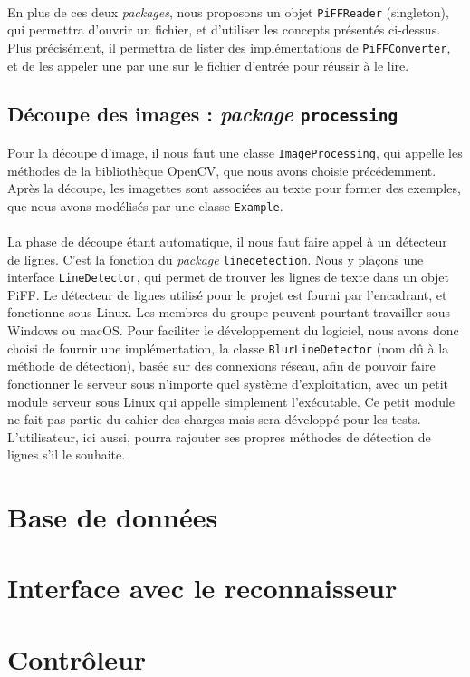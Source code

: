 \paragraph{}
En plus de ces deux \textit{packages}, nous proposons un objet \texttt{PiFFReader} (singleton), qui permettra d'ouvrir un fichier, et d'utiliser les concepts présentés ci-dessus. Plus précisément, il permettra de lister des implémentations de \texttt{PiFFConverter}, et de les appeler une par une sur le fichier d'entrée pour réussir à le lire.

\subsection{Découpe des images : \textit{package} \texttt{processing}}

Pour la découpe d'image, il nous faut une classe \texttt{ImageProcessing}, qui appelle les méthodes de la bibliothèque OpenCV, que nous avons choisie précédemment. Après la découpe, les imagettes sont associées au texte pour former des exemples, que nous avons modélisés par une classe \texttt{Example}. 

\paragraph{}
La phase de découpe étant automatique, il nous faut faire appel à un détecteur de lignes. C'est la fonction du \textit{package} \texttt{linedetection}. Nous y plaçons une interface \texttt{LineDetector}, qui permet de trouver les lignes de texte dans un objet PiFF. Le détecteur de lignes utilisé pour le projet est fourni par l'encadrant, et fonctionne sous Linux. Les membres du groupe peuvent pourtant travailler sous Windows ou macOS. Pour faciliter le développement du logiciel, nous avons donc choisi de fournir une implémentation, la classe \texttt{BlurLineDetector} (nom dû à la méthode de détection), basée sur des connexions réseau, afin de pouvoir faire fonctionner le serveur sous n'importe quel système d'exploitation, avec un petit module serveur sous Linux qui appelle simplement l'exécutable. Ce petit module ne fait pas partie du cahier des charges mais sera développé pour les tests. L'utilisateur, ici aussi, pourra rajouter ses propres méthodes de détection de lignes s'il le souhaite.

\section{Base de données}

\section{Interface avec le reconnaisseur}

\section{Contrôleur}
